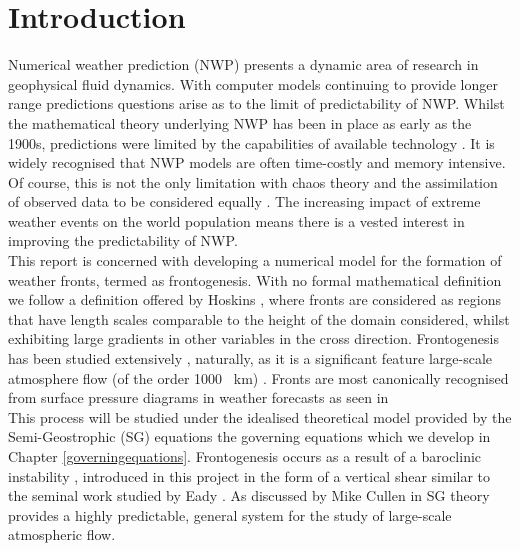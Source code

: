 \chapter*{Introduction}
Numerical weather prediction (NWP) presents a dynamic area of research in geophysical fluid dynamics. With computer models continuing to provide longer range predictions \cite{Cullen2006a} questions arise as to the limit of predictability of NWP. Whilst the mathematical theory underlying NWP has been in place as early as the 1900s, predictions were limited by the capabilities of available technology \cite{Golding2004}. It is widely recognised that NWP models are often time-costly and memory intensive. Of course, this is not the only limitation with chaos theory and the assimilation of observed data to be considered equally \cite{Weisheimer}. The increasing impact of extreme weather events on the world population means there is a vested interest in improving the predictability of NWP.
\\
\linebreak
This report is concerned with developing a numerical model for the formation of weather fronts, termed as frontogenesis.
With no formal mathematical definition we follow a definition offered by Hoskins \cite{Hoskins1982}, where fronts are considered as regions that have length scales comparable to the height of the domain considered, whilst exhibiting large gradients in other variables in the cross direction. Frontogenesis has been studied extensively \cite{Yamazaki2017, Cullen2008, Rotunno1994,Nakamura1988,Nakamura1994}, naturally, as it is a significant feature large-scale atmosphere flow (of the order 1000 \ km) \cite{Cullen2006a}. Fronts are most canonically recognised from surface pressure diagrams in weather forecasts as seen in \cite{fig:surfacepressure}
\\
\linebreak
This process will be studied under the idealised theoretical model provided by the Semi-Geostrophic (SG) equations the governing equations which we develop in Chapter \ref{governingequations}. Frontogenesis occurs as a result of a baroclinic instability \cite{Hoskins1982}, introduced in this project in the form of a vertical shear similar to the seminal work studied by Eady \cite{Eady}. As discussed by Mike Cullen in \cite{Cullen2006a} SG theory provides a highly predictable, general system for the study of large-scale atmospheric flow. 
\\
\linebreak
